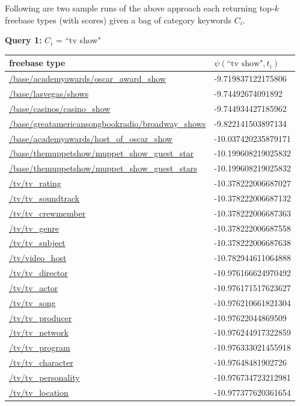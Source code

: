 \documentclass[a4paper, twoside, 12pt]{report}
\begin{document}
Following are two sample runs of the above approach each returning top-$k$ freebase types (with scores) given a bag of category keywords $C_i$.

\textbf{Query 1:} $C_i$ = ``tv show"
\begin{longtable}{| p{} | p{} |} 
\hline
\textbf{freebase type} & $\psi(\text{``tv show"}, t_i)$ \\ \hline \hline

\url{/base/academyawards/oscar_award_show} & -9.719837122175806 \\ \hline
\url{/base/lasvegas/shows} & -9.74492674091892 \\ \hline
\url{/base/casinos/casino_show} & -9.744934427185962 \\ \hline
\url{/base/greatamericansongbookradio/broadway_shows} & -9.822141503897134 \\ \hline
\url{/base/academyawards/host_of_oscar_show} & -10.037420235879171 \\ \hline
\url{/base/themuppetshow/muppet_show_guest_star} & -10.199608219025832 \\ \hline
\url{/base/themuppetshow/muppet_show_guest_stars} & -10.199608219025832 \\ \hline
\url{/tv/tv_rating} & -10.378222006687027 \\ \hline
\url{/tv/tv_soundtrack} & -10.378222006687132 \\ \hline
\url{/tv/tv_crewmember} & -10.378222006687363 \\ \hline
\url{/tv/tv_genre} & -10.378222006687558 \\ \hline
\url{/tv/tv_subject} & -10.378222006687638 \\ \hline
\url{/tv/video_host} & -10.782944611064888 \\ \hline
\url{/tv/tv_director} & -10.976166624970492 \\ \hline
\url{/tv/tv_actor} & -10.976171517623627 \\ \hline
\url{/tv/tv_song} & -10.976210661821304 \\ \hline
\url{/tv/tv_producer} & -10.97622044869509 \\ \hline
\url{/tv/tv_network} & -10.976244917322859 \\ \hline
\url{/tv/tv_program} & -10.976333021455918 \\ \hline
\url{/tv/tv_character} & -10.97648481902726 \\ \hline
\url{/tv/tv_personality} & -10.976734723212981 \\ \hline
\url{/tv/tv_location} & -10.977377620361654 \\ \hline

\end{longtable}
\end{document}
